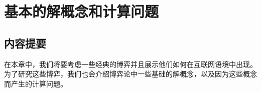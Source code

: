 \chapter{\textbf{基本的解概念和计算问题}}
\label{basic_concepts}

\section*{内容提要} 在本章中，我们将要考虑一些经典的博弈并且展示他们如何在互联网语境中出现。为了研究这些博弈，我们也会介绍博弈论中一些基础的解概念，以及因为这些概念而产生的计算问题。